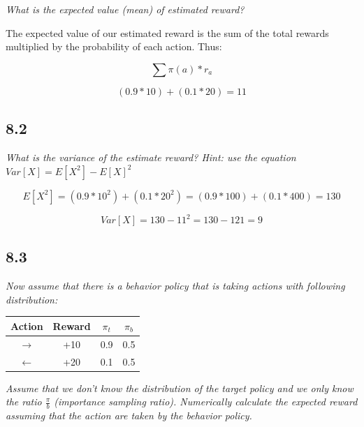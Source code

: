 \documentclass{article}
\begin{document}
\textit{What is the expected value (mean) of estimated reward?}

The expected value of our estimated reward is the sum of the total rewards multiplied by the probability of each action. Thus:

\begin{equation}
    \sum \pi(a) * r_a
\end{equation}

\begin{equation}
    (0.9 * 10) + (0.1* 20) = 11
\end{equation}

\subsection*{8.2}

\textit{What is the variance of the estimate reward? Hint: use the equation $Var[X] = E[X^2] - E[X]^2$}

\begin{equation}
    E[X^2] = (0.9 * 10^2) + (0.1*20^2) = (0.9*100) + (0.1*400) = 130
\end{equation}

\begin{equation}
    Var[X] = 130 - 11^2 = 130 - 121 = 9
\end{equation}

\subsection*{8.3}

\textit{Now assume that there is a behavior policy that is taking actions with following distribution:}

\begin{center}
    \begin{tabular}{ |c|c|c|c| }
        \hline
        Action        & Reward & $\pi_t$ & $\pi_b$ \\
        \hline
        $\rightarrow$ & +10    & 0.9     & 0.5     \\
        \hline
        $\leftarrow$  & +20    & 0.1     & 0.5     \\
        \hline
    \end{tabular}
\end{center}

\textit{Assume that we don't know the distribution of the target policy and we only know the ratio $\frac{\pi}{b}$ (importance sampling ratio). Numerically calculate the expected reward assuming that the action are taken by the behavior policy.}
\end{document}
